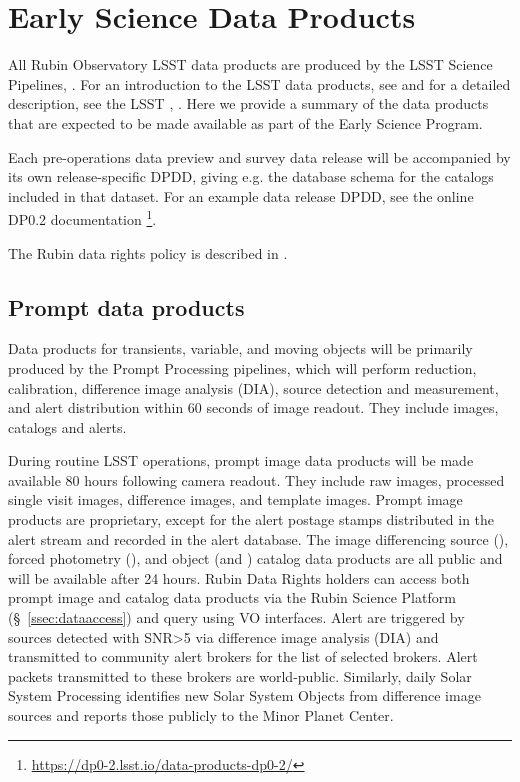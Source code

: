 \section{Early Science Data Products}
\label{sec:data}

All Rubin Observatory LSST data products are produced by the LSST Science Pipelines, \cite{2019ASPC..523..521B,2018PASJ...70S...5B}. 
For an introduction to the LSST data products, see \citet{RubinDataProductsAbridged} and for a detailed description, see the LSST \dpdd,  \citet{LSE-163}.
Here we provide a summary of the data products that are expected to be made available as part of the Early Science Program.

Each pre-operations data preview and survey data release will be accompanied by its own release-specific DPDD, giving e.g. the  database schema for the catalogs included in that dataset.
For an example data release DPDD, see the online DP0.2 documentation \footnote{\url{https://dp0-2.lsst.io/data-products-dp0-2/}}.

The Rubin data rights policy is described in  \cite{RDO-013}.

\subsection{Prompt data products}

Data products for transients, variable, and moving objects will be primarily produced by the Prompt Processing pipelines, which will perform reduction, calibration, difference image analysis (DIA), source detection and measurement, and alert distribution within 60 seconds of image readout. 
They include images, catalogs and alerts. 

During routine LSST operations, prompt image data products will be made available 80 hours following camera readout. 
They include raw images, processed single visit images, difference images, and template images. 
Prompt image products are proprietary, except for the alert postage stamps distributed in the alert stream and recorded in the alert database.
The image differencing source (\DIASource), forced photometry (\DIAForcedSource), and object (\DIAObject and \SSObject)
catalog data products are all public and will be available after 24 hours. 
Rubin Data Rights holders can access both prompt image and catalog data products via the Rubin Science Platform (\S~\ref{ssec:dataaccess}) and query using VO interfaces. 
Alert are triggered by sources detected with SNR>5 via difference image analysis (DIA) and transmitted to community alert brokers for the list of selected brokers.
Alert packets transmitted to these brokers are world-public.
Similarly, daily Solar System Processing identifies new Solar System Objects from difference image sources and reports those publicly to the Minor Planet Center.


